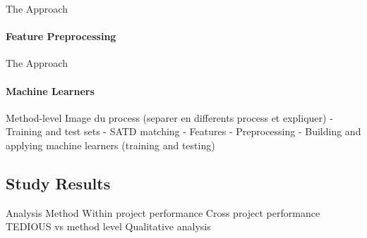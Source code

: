 \documentclass{beamer}
\begin{document}
\begin{darkframes}
    	    \begin{frame}{The Approach}
		    	\framesubtitle{Feature Preprocessing}
		    	\begin{figure}[t]
		    		\centering
		    	\end{figure}
		    \end{frame}
	    
	    
	        \begin{frame}{The Approach}
			    \framesubtitle{Machine Learners}
			    \begin{figure}[t]
			    	\centering
			    \end{figure}
		    \end{frame}
		    	
		    Method-level
		    Image du process (separer en differents process et expliquer)
		    	- Training and test sets
		    	- SATD matching
		    	- Features
		    	- Preprocessing
		    	- Building and applying machine learners (training and testing)
		    
		    \subsection{Study Results}
		    
		    Analysis Method
		    Within project performance
		    Cross project performance
		    TEDIOUS vs method level
		    Qualitative analysis
		    
	\end{darkframes}
\end{document}
